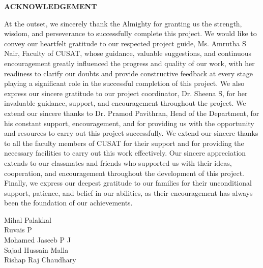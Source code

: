 \clearpage
{}
{}
\thispagestyle{footeronly}

\begin{center}
{\Large \textbf{ACKNOWLEDGEMENT}}
\end{center}

\justifying
\noindent

At the outset, we sincerely thank the Almighty for granting us the strength, wisdom, and perseverance to successfully
complete this project. We would like to convey our heartfelt gratitude to our respected project guide, Ms. Amrutha S Nair,
Faculty of CUSAT, whose guidance, valuable suggestions, and continuous encouragement greatly influenced the progress and quality
of our work, with her readiness to clarify our doubts and provide constructive feedback at every stage playing a significant role in
the successful completion of this project. We also express our sincere gratitude to our project coordinator, Dr. Sheena S, for her invaluable
guidance, support, and encouragement throughout the project. We extend our sincere thanks to Dr. Pramod Pavithran, Head of the Department, for his
constant support, encouragement, and for providing us with the opportunity and resources to carry out this project successfully. We extend our sincere thanks
to all the faculty members of CUSAT for their support and for providing the necessary facilities to carry out this work effectively. Our sincere appreciation extends to
our classmates and friends who supported us with their ideas, cooperation, and encouragement throughout the development of this project. Finally, we express our deepest
gratitude to our families for their unconditional support, patience, and belief in our abilities, as their encouragement has always been the foundation of our achievements.

\vspace{1.5cm}
\noindent Mihal Palakkal\\
Ruvais P\\
Mohamed Jaseeb P J\\
Sajad Hussain Malla\\
Rishap Raj Chaudhary

\vfill
\clearpage